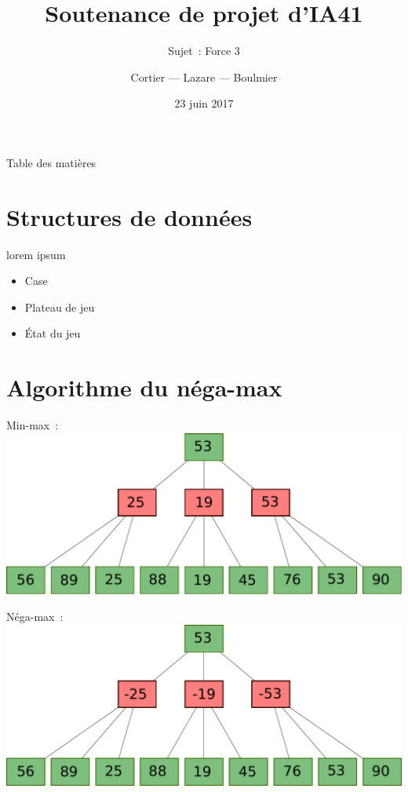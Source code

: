 \documentclass[11pt]{beamer}
\author{Cortier — Lazare — Boulmier}
\institute[]{UTBM}
\title{Soutenance de projet d'IA41}
\subtitle{Sujet : Force 3}
\date{23 juin 2017}
\begin{document}
\begin{frame}
    \titlepage{}
\end{frame}

\begin{frame}{Table des matières}
    \tableofcontents
\end{frame}

\section{Structures de données}

\begin{frame}
    \begin{block}{lorem ipsum}
            \begin{itemize}
                \item Case
                \item Plateau de jeu
                \item État du jeu
            \end{itemize}
    \end{block}
\end{frame}

\section{Algorithme du néga-max}

\begin{frame}
    Min-max :
    \includegraphics[width=\linewidth]{minmax}
\end{frame}

\begin{frame}
    Néga-max :
    \includegraphics[width=\linewidth]{negamax}
\end{frame}
\end{document}
